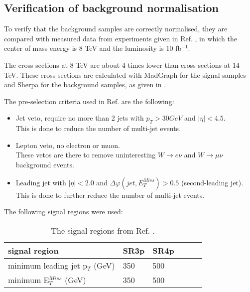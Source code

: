 \subsection{Verification of background normalisation}\label{sec:sig:subsec:veri} 	
To verify that the background samples are correctly normalised, they are compared with measured data from experiments given in Ref. \citep{ATLAS-CONF-2012-147}, in which the center of mass energy is 8 TeV and the luminosity is 10 fb$^{-1}$. 

The cross sections at 8 TeV are about 4 times lower than cross sections at 14 TeV.
These cross-sections are calculated with MadGraph\citep{madgraph} for the signal samples and Sherpa \citep{sherpa} for the background samples, as given in . 

The pre-selection criteria used in Ref. \citep{ATLAS-CONF-2012-147} are the following:
\begin{itemize}
\item Jet veto, require no more than 2 jets with $p_T > 30 GeV$ and $|\eta| < 4.5$.  \\ 
This is done to reduce the number of multi-jet events.
\item Lepton veto, no electron or muon. \\
These vetos are there to remove uninteresting $W \rightarrow e \nu$ and $W \rightarrow \mu \nu$ background events.
\item Leading jet with $|\eta| < 2.0$ and $\Delta \varphi (jet, E_T^{Miss})>0.5$ (second-leading jet).\\ 
This is done to further reduce the number of multi-jet events.
\end{itemize}
The following signal regions were used:
\begin{table}[h]
\renewcommand{\arraystretch}{1.2} %
\begin{center}
\begin{tabular}{l l l l l l}
\hline
signal region & SR3p & SR4p \\ \hline
minimum leading jet p$_T$ (GeV) & 350 & 500 \\
minimum E$^{Miss}_T$ (GeV) & 350 & 500 \\ \hline
\end{tabular}
\label{tab:oldsr}
\caption{The signal regions from Ref. \citep{ATLAS-CONF-2012-147}.}
\end{center}
\renewcommand{\arraystretch}{1.0} %
\end{table}


